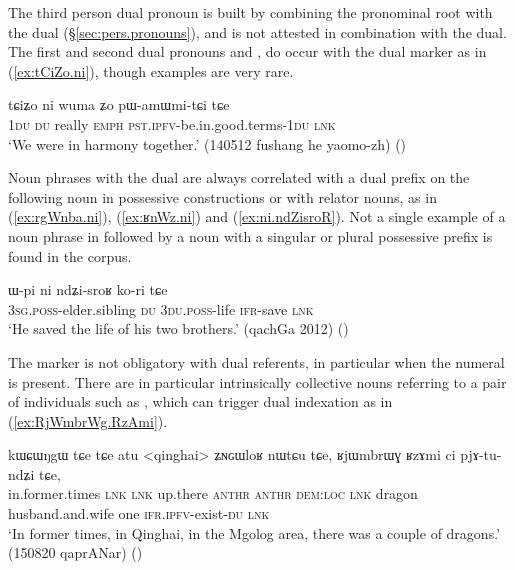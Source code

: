 The third person dual pronoun  is built by combining the pronominal root  with the dual  (§\ref{sec:pers.pronouns}), and is not attested in combination with the dual. The first and second dual pronouns  and , do occur with the dual marker as in (\ref{ex:tCiZo.ni}), though examples are very rare.

\begin{exe}
\ex \label{ex:tCiZo.ni}
\gll  tɕiʑo ni wuma ʑo pɯ-amɯmi-tɕi tɕe \\
\textsc{1du} \textsc{du} really \textsc{emph} \textsc{pst}.\textsc{ipfv}-be.in.good.terms-\textsc{1du} \textsc{lnk} \\
\glt `We were in harmony together.' (140512 fushang he yaomo-zh)
()
\end{exe}

Noun phrases with the dual  are always correlated with a dual prefix on the following noun in possessive constructions or with relator nouns, as in (\ref{ex:rgWnba.ni}), (\ref{ex:ʁnWz.ni}) and (\ref{ex:ni.ndZisroR}). Not a single example of a noun phrase in  followed by a noun with a singular or plural possessive prefix is found in the corpus.

\begin{exe}
\ex \label{ex:ni.ndZisroR} 
\gll ɯ-pi ni ndʑi-sroʁ ko-ri tɕe \\
\textsc{3sg}.\textsc{poss}-elder.sibling \textsc{du} \textsc{3du}.\textsc{poss}-life \textsc{ifr}-save \textsc{lnk} \\
\glt `He saved the life of his two brothers.' (qachGa 2012)
()
\end{exe}

The marker  is not obligatory with dual referents, in particular when the numeral  is present. 
There are in particular intrinsically collective nouns referring to a pair of individuals  such as , which can trigger dual indexation as in (\ref{ex:RjWmbrWg.RzAmi}).

\begin{exe}
\ex \label{ex:RjWmbrWg.RzAmi}
\gll  kɯɕɯŋgɯ tɕe tɕe atu <qinghai> ʑɴɢɯloʁ nɯtɕu tɕe, ʁjɯmbrɯɣ ʁzɤmi ci pjɤ-tu-ndʑi tɕe,  \\
in.former.times \textsc{lnk}  \textsc{lnk} up.there  \textsc{anthr} \textsc{anthr} \textsc{dem}:\textsc{loc} \textsc{lnk} dragon husband.and.wife one \textsc{ifr}.\textsc{ipfv}-exist-\textsc{du} \textsc{lnk} \\
\glt `In former times, in Qinghai, in the Mgolog area, there was a couple of dragons.' (150820 qaprANar)
()
\end{exe}

